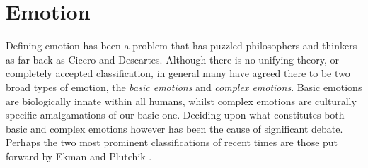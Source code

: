 \begin{comment}

Understanding sentiment on Twitter however, requires slight changes to our approach. We will assume that opinion expressed within a tweet is the user's own, and that the time at which a tweet is posted reflects the time at which any opinion in it was cast. This leaves us with three core problems. First we must determine whether a tweet contains an opinion, and if so, we must be able to both classify it and determine its topic. Research into Twitter-targeted sentiment analysis is limited, however, due to the length constraints placed upon tweets, aspects of sentence-level classification still bare relevance. Furthemore work such as Bermingham' \cite{Bermingham:2010vh} and Barbosa's \cite{Barbosa:ws} highlight some key variations in approach to sentiment analysis on Twitter.

\cite{Barbosa:ws} - suggests 2-step framework, subjectivity detetction then classification
\cite{Barbosa:ws} - additional features from tweet syntax

Robust sentiment detection \cite{Barbosa:ws}
	- good overview

Identifying themes/sentiment \cite{KumarPal:2010fd}
- good topic extraction

Is brevity an advantage? \cite{Bermingham:2010vh}

Sentiment in twitter events \cite{Thelwall:to}

Distant supervision \cite{Go:2009ut}

\end{comment}

\section{Emotion}
\label{background:emotion}

Defining emotion has been a problem that has puzzled philosophers and thinkers as far back as Cicero and Descartes. Although there is no unifying theory, or completely accepted classification, in general many have agreed there to be two broad types of emotion, the \emph{basic emotions} and \emph{complex emotions}. Basic emotions are biologically innate within all humans, whilst complex emotions are culturally specific amalgamations of our basic one. Deciding upon what constitutes both basic and complex emotions however has been the cause of significant debate. Perhaps the two most prominent classifications of recent times are those put forward by Ekman \cite{Ekman:1969ux} and Plutchik \cite{Plutchik:2001tp}. 

